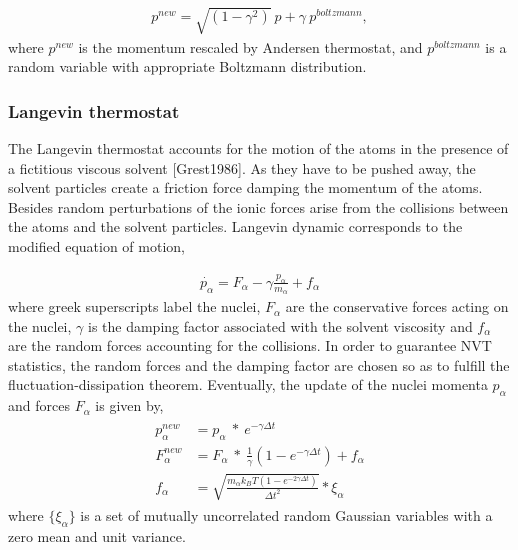 \documentclass[letterpaper,10pt,english]{sphinxmanual}
\begin{document}
\label{\detokenize{BOMD:equation-ander2}}\begin{equation}\label{equation:BOMD:ander2}
\begin{split}p^{new} = \sqrt{(1-\gamma^2)}\  p + \gamma \  p^{boltzmann},\end{split}
\end{equation}
where \(p^{new}\) is the momentum rescaled by Andersen thermostat,
and \(p^{boltzmann}\) is a random variable with appropriate
Boltzmann distribution.


\subsubsection{Langevin thermostat}
\label{\detokenize{BOMD:langevin-thermostat}}
The Langevin thermostat accounts for the motion of the atoms in the
presence of a fictitious viscous solvent {[}Grest1986{]}. As
they have to be pushed away, the solvent particles create a friction
force damping the momentum of the atoms. Besides random perturbations of
the ionic forces arise from the collisions between the atoms and the
solvent particles. Langevin dynamic corresponds to the modified equation
of motion,

\label{\detokenize{BOMD:equation-langevin1}}\begin{equation}\label{equation:BOMD:langevin1}
\begin{split}\dot{p_{\alpha}} = F_{\alpha} - \gamma \frac{p_{\alpha}}{m_{\alpha}} + f_{\alpha}\end{split}
\end{equation}
where greek superscripts label the nuclei, \(F_{\alpha}\) are the
conservative forces acting on the nuclei, \(\gamma\) is the damping
factor associated with the solvent viscosity and \(f_{\alpha}\) are
the random forces accounting for the collisions. In order to guarantee
NVT statistics, the random forces and the damping factor are chosen so
as to fulfill the fluctuation-dissipation theorem. Eventually, the
update of the nuclei momenta \(p_{\alpha}\) and forces
\(F_{\alpha}\) is given by,
\begin{equation*}
\begin{split}\begin{aligned}
p_{\alpha}^{new} &= p_{\alpha} \ * \ e^{-\gamma \Delta t} \\
F_{\alpha}^{new} &= F_{\alpha} \ * \ \frac{1}{\gamma}(1-e^{-\gamma \Delta t}) + f_{\alpha}\\
f_{\alpha} &= \sqrt{ \frac{m_{\alpha} k_B T (1-e^{-2 \gamma \Delta t})}{\Delta t^2}}*\xi_{\alpha}\end{aligned}\end{split}
\end{equation*}
where \(\{\xi_\alpha\}\) is a set of mutually uncorrelated random
Gaussian variables with a zero mean and unit variance.
\end{document}
